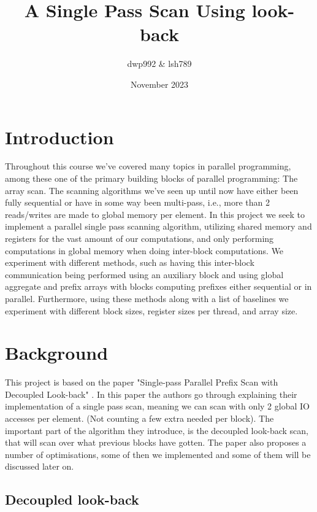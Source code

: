 \documentclass[twocolumn]{article}
\title{A Single Pass Scan Using look-back}
\author{dwp992 \& lsh789}
\date{November 2023\vspace{2ex}}
\begin{document}
\maketitle
\thispagestyle{fancy}

\section{Introduction}
Throughout this course we've covered many topics in parallel programming, among these one of the primary building blocks of parallel programming: The array scan. The scanning algorithms we've seen up until now have either been fully sequential or have in some way been multi-pass, i.e., more than 2 reads/writes are made to global memory per element. In this project we seek to implement a parallel single pass scanning algorithm, utilizing shared memory and registers for the vast amount of our computations, and only performing computations in global memory when doing inter-block computations. We experiment with different methods, such as having this inter-block communication being performed using an auxiliary block and using global aggregate and prefix arrays with blocks computing prefixes either sequential or in parallel. Furthermore, using these methods along with a list of baselines we experiment with different block sizes, register sizes per thread, and array size.

\section{Background}
\label{sec:background}

This project is based on the paper "Single-pass Parallel Prefix Scan with Decoupled Look-back" \cite{SPS_paper}. In this paper the authors go through explaining their implementation of a single pass scan, meaning we can scan with only 2 global IO accesses per element. (Not counting a few extra needed per block). The important part of the algorithm they introduce, is the decoupled look-back scan, that will scan over what previous blocks have gotten. The paper also proposes a number of optimisations, some of then we implemented and some of them will be discussed later on.

\subsection{Decoupled look-back}
\end{document}
